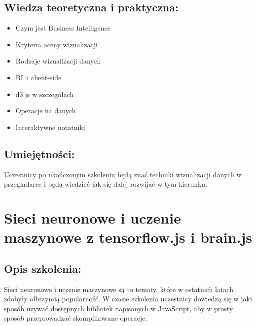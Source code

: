 \documentclass{article}[10pt]
\begin{document}
	\subsection*{Wiedza teoretyczna i praktyczna:}
\begin{adjustwidth}{1.5cm}{}
	\begin{itemize}
		\item Czym jest Business Intelligence
		\item Kryteria oceny wizualizacji
		\item Rodzaje wizualizacji danych
		\item BI a client-side
		\item d3.js w szczegółach
		\item Operacje na danych
		\item Interaktywne notatniki
	\end{itemize}
\end{adjustwidth}

	\subsection*{Umiejętności:}
\begin{adjustwidth}{2cm}{}
\justifying
	
Uczestnicy po ukończonym szkoleniu będą znać techniki wizualizacji danych w przeglądarce i będą wiedzieć jak się dalej rozwijać w tym kierunku.


\end{adjustwidth}

\newpage


    
	\section{Sieci neuronowe i uczenie maszynowe z tensorflow.js i brain.js}

	\subsection*{Opis szkolenia:}
	\begin{adjustwidth}{2cm}{}
\justifying
		Sieci neuronowe i uczenie maszynowe są to tematy, które w ostatnich latach zdobyły olbrzymią popularność. W czasie szkolenia uczestnicy dowiedzą się w jaki sposób używać dostępnych bibliotek napisanych w JavaScript, aby w prosty sposób przeprowadzać skomplikowane operacje.


	\end{adjustwidth}
\end{document}
